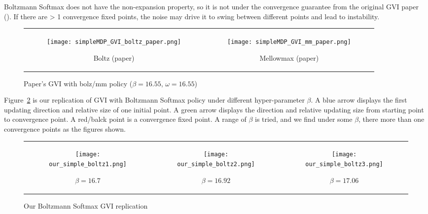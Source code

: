 Boltzmann Softmax does not have the non-expansion property, 
so it is not under the convergence guarantee from the original GVI paper (\cite{littman1996generalized}). 
If there are > 1 convergence fixed points, the noise may drive it to swing 
between different points and lead to instability.

{\centering
\begin{figure}[H]
\begin{tabular}{cc}
\begin{subfigure}{0.45\textwidth}\centering\texttt{[image: simpleMDP\_GVI\_boltz\_paper.png]}\caption{Boltz (paper)}\end{subfigure}&
\begin{subfigure}{0.45\textwidth}\centering\texttt{[image: simpleMDP\_GVI\_mm\_paper.png]}\caption{Mellowmax (paper)}\end{subfigure}\\
\end{tabular}
\caption{Paper's GVI with bolz/mm policy ($\beta=16.55$, $\omega=16.55$)}\label{fig:simple_mdp_gvi_paper}
\end{figure}}


Figure\ \ref{fig:simple_mdp_gvi_our_bolz} is our replication of GVI with Boltzmann Softmax policy under different hyper-parameter $\beta$.
A blue arrow displays the first updating direction and relative size  of one initial point.
A green arrow displays the direction and relative updating size from starting point to convergence point.
A red/balck point is a convergence fixed point.
A range of $\beta$ is tried, and we find under some $\beta$, there more than one convergence points as the figures shown.

{\centering
\begin{figure}[H]
\begin{tabular}{ccc}
\begin{subfigure}{0.33\textwidth}\centering\texttt{[image: our\_simple\_boltz1.png]}\caption{$\beta=16.7$}\end{subfigure}&
\begin{subfigure}{0.33\textwidth}\centering\texttt{[image: our\_simple\_boltz2.png]}\caption{$\beta=16.92$}\end{subfigure}&
\begin{subfigure}{0.33\textwidth}\centering\texttt{[image: our\_simple\_boltz3.png]}\caption{$\beta=17.06$}\end{subfigure}\\
\end{tabular}
\caption{Our Boltzmann Softmax GVI replication}\label{fig:simple_mdp_gvi_our_bolz}
\end{figure}}

